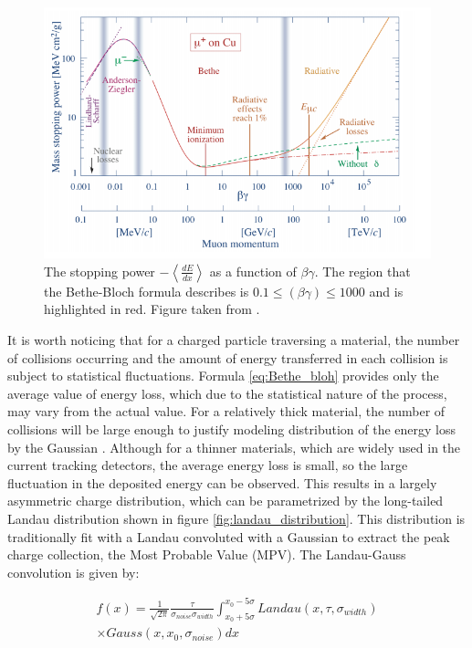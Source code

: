 \begin{figure}[h]
\centering
\includegraphics{figures/Bete_bloh.PNG}
\caption{ The stopping power $-\left< \frac{dE}{dx} \right>$ as a function of $\beta \gamma$. The region that the Bethe-Bloch formula describes is $0.1 \le (\beta \gamma) \le 1000$ and is highlighted in red. Figure taken from \cite{PDG}.
\label{fig:Bethe_bloh}}
\end{figure}


It is worth noticing that for a charged particle traversing a material, the number of collisions occurring and the amount of energy transferred in each collision is subject to statistical fluctuations. Formula \ref{eq:Bethe_bloh} provides only the average value of energy loss, which due to the statistical nature of the process, may vary from the actual value. 
For a relatively thick material, the number of collisions will be large enough to justify modeling distribution of the energy loss by the Gaussian \cite{gauss_sensor}. Although for a thinner materials, which are widely used in the current tracking detectors, the average energy loss is small, so the large fluctuation in the deposited energy can be observed.    
 This results in a largely asymmetric charge distribution, which can be parametrized by the long-tailed Landau distribution shown in figure \ref{fig:landau_distribution}.  This distribution is traditionally fit with a Landau convoluted with a Gaussian to extract the peak charge collection, the Most Probable Value (MPV). The Landau-Gauss convolution is given by:

\begin{equation}
    \begin{split}
    f(x) = \frac{1}{\sqrt{2 \pi}} \frac{\tau}{\sigma_{noise} \sigma_{width}} \int_{x_0+5\sigma}^{x_0-5\sigma} Landau(x, \tau, \sigma_{width}) \\ \times Gauss (x, x_0,\sigma_{noise}) dx
    \end{split}
\end{equation}

